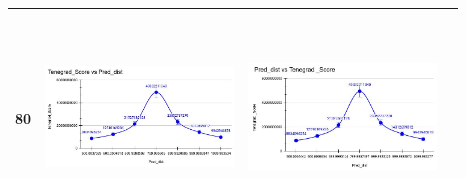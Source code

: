 \documentclass[sn-mathphys]{sn-jnl}%
\theoremstyle{thmstyleone}%
\theoremstyle{thmstyletwo}%
\theoremstyle{thmstylethree}%
\begin{document}
\begin{table}[!htbp]
\begin{tabular}{ c c c c }
\hline
80 & \includegraphics[width=5cm,height=5.5cm]{rf80.JPG} & \includegraphics[width=5cm,height=5.5cm]{gbr80.JPG} \\
\hline

\end{tabular}
\end{table}
\end{document}
